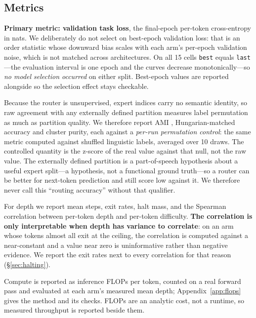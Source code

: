 \subsection{Metrics}
\label{sec:metrics}

\textbf{Primary metric: validation task loss}, the final-epoch per-token
cross-entropy in nats. We deliberately do not select on best-epoch validation loss:
that is an order statistic whose downward bias scales with each arm's per-epoch
validation noise, which is not matched across architectures. On all 15 cells
\texttt{best} equals \texttt{last}---the evaluation interval is one epoch and the
curves decrease monotonically---so \emph{no model selection occurred} on either
split. Best-epoch values are reported alongside so the selection effect stays
checkable.

Because the router is unsupervised, expert indices carry no semantic identity, so
raw agreement with any externally defined partition measures label permutation as
much as partition quality. We therefore report AMI \citep{vinh2010ami},
Hungarian-matched accuracy and cluster purity, each against a \emph{per-run
permutation control}: the same metric computed against shuffled linguistic labels,
averaged over 10 draws. The controlled quantity is the z-score of the real value
against that null, not the raw value. The externally defined partition is a
part-of-speech hypothesis about a useful expert split---a hypothesis, not a
functional ground truth---so a router can be better for next-token prediction and
still score low against it. We therefore never call this ``routing accuracy''
without that qualifier.

For depth we report mean steps, exit rates, halt mass, and the Spearman correlation
between per-token depth and per-token difficulty. \textbf{The correlation is only
interpretable when depth has variance to correlate}: on an arm whose tokens almost
all exit at the ceiling, the correlation is computed against a near-constant and a
value near zero is uninformative rather than negative evidence. We report the exit
rates next to every correlation for that reason (\S\ref{sec:halting}).

Compute is reported as inference FLOPs per token, counted on a real forward pass
and evaluated at each arm's measured mean depth; Appendix~\ref{app:flops} gives the
method and its checks. FLOPs are an analytic cost, not a runtime, so measured
throughput is reported beside them.

